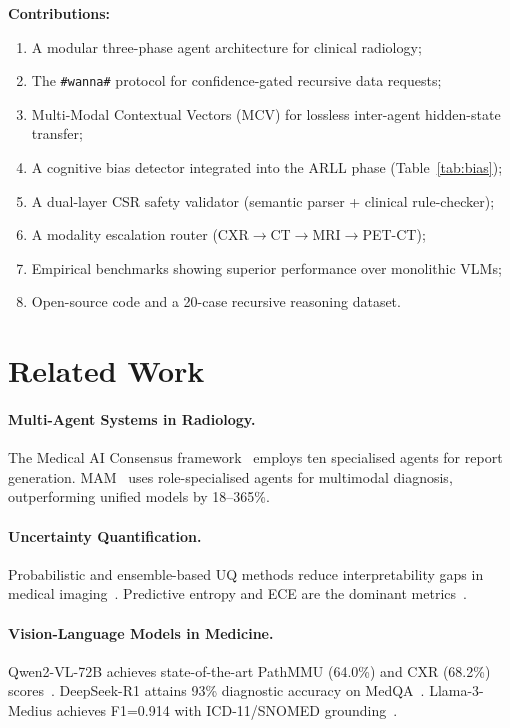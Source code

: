 \documentclass[10pt,twocolumn]{article}
\begin{document}
\noindent\textbf{Contributions:}
\begin{enumerate}[noitemsep,leftmargin=*]
  \item A modular three-phase agent architecture for clinical radiology;
  \item The \texttt{\#wanna\#} protocol for confidence-gated recursive data requests;
  \item Multi-Modal Contextual Vectors (MCV) for lossless inter-agent hidden-state transfer;
  \item A cognitive bias detector integrated into the ARLL phase (Table~\ref{tab:bias});
  \item A dual-layer CSR safety validator (semantic parser + clinical rule-checker);
  \item A modality escalation router (CXR$\to$CT$\to$MRI$\to$PET-CT);
  \item Empirical benchmarks showing superior performance over monolithic VLMs;
  \item Open-source code and a 20-case recursive reasoning dataset.
\end{enumerate}

\section{Related Work}
\label{sec:related}

\paragraph{Multi-Agent Systems in Radiology.}
The Medical AI Consensus framework~\cite{anon2025consensus} employs ten specialised
agents for report generation. MAM~\cite{zhou2025mam} uses role-specialised agents
for multimodal diagnosis, outperforming unified models by 18--365\%.

\paragraph{Uncertainty Quantification.}
Probabilistic and ensemble-based UQ methods reduce interpretability gaps in medical
imaging~\cite{huang2024uq}. Predictive entropy and ECE are the dominant
metrics~\cite{xu2025uncertainty}.

\paragraph{Vision-Language Models in Medicine.}
Qwen2-VL-72B achieves state-of-the-art PathMMU (64.0\%) and CXR (68.2\%)
scores~\cite{hf2025qwen2}. DeepSeek-R1 attains 93\% diagnostic accuracy on
MedQA~\cite{gao2025deepseek}. Llama-3-Medius achieves F1=0.914 with ICD-11/SNOMED
grounding~\cite{cui2025kg}.
\end{document}
